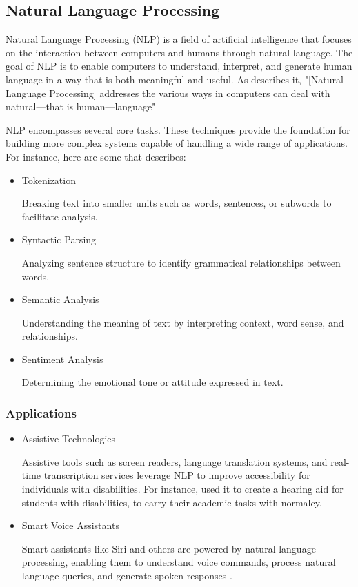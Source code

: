 \subsection{Natural Language Processing}

Natural Language Processing (NLP) is a field of artificial intelligence that focuses on the interaction between computers and humans through natural language. The goal of NLP is to enable computers to understand, interpret, and generate human language in a way that is both meaningful and useful. As \cite{book:nlp-2022} describes it, "[Natural Language Processing] addresses the various ways in computers can deal with natural—that is human—language"

NLP encompasses several core tasks. These techniques provide the foundation for building more complex systems capable of handling a wide range of applications. For instance, here are some that \cite{book:nlp-2022} describes:

\begin{itemize}
    \item Tokenization
    
    Breaking text into smaller units such as words, sentences, or subwords to facilitate analysis.

    \item Syntactic Parsing 
    
    Analyzing sentence structure to identify grammatical relationships between words.

    \item Semantic Analysis
    
    Understanding the meaning of text by interpreting context, word sense, and relationships.
    
    \item Sentiment Analysis 
    
    Determining the emotional tone or attitude expressed in text. 
\end{itemize}

\subsubsection{Applications}

\begin{itemize}
    \item Assistive Technologies
    
    Assistive tools such as screen readers, language translation systems, and real-time transcription services leverage NLP to improve accessibility for individuals with disabilities. For instance, \cite{art:nlp-2019} used it to create a hearing aid for students with disabilities, to carry their academic tasks with normalcy.

    \item Smart Voice Assistants

    Smart assistants like Siri and others are powered by natural language processing, enabling them to understand voice commands, process natural language queries, and generate spoken responses 
    \citep{art:voiceassistants-2020}.
\end{itemize}


